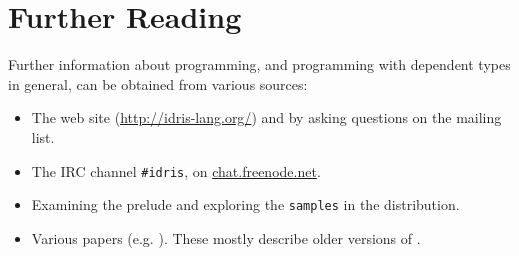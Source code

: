 \section{Further Reading}

Further information about \Idris{} programming, and programming with dependent
types in general, can be obtained from various sources:

\begin{itemize}
\item The \Idris{} web site (\url{http://idris-lang.org/}) and by asking questions
on the mailing list.
\item The IRC channel \texttt{\#idris}, on \url{chat.freenode.net}.
\item Examining the prelude and exploring the \texttt{samples} in the distribution.
\item Various papers (e.g. \cite{plpv11, scrap-engine,res-dsl-padl12}). These mostly describe
older versions of \Idris{}.
\end{itemize}

